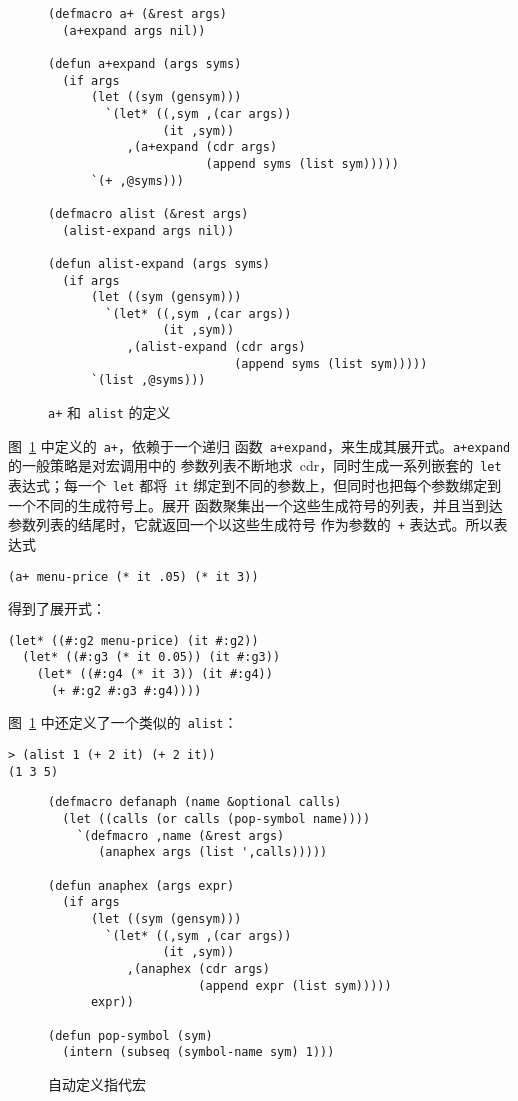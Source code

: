 \begin{figure}
\begin{lstlisting}
(defmacro a+ (&rest args)
  (a+expand args nil))

(defun a+expand (args syms)
  (if args
      (let ((sym (gensym)))
        `(let* ((,sym ,(car args))
                (it ,sym))
           ,(a+expand (cdr args)
                      (append syms (list sym)))))
      `(+ ,@syms)))

(defmacro alist (&rest args)
  (alist-expand args nil))

(defun alist-expand (args syms)
  (if args
      (let ((sym (gensym)))
        `(let* ((,sym ,(car args))
                (it ,sym))
           ,(alist-expand (cdr args)
                          (append syms (list sym)))))
      `(list ,@syms)))
\end{lstlisting}
  \caption{\texttt{a+} 和~\texttt{alist} 的定义}
  \label{fig:definitions_of_aplus_and_alist}
\end{figure}

图~\ref{fig:definitions_of_aplus_and_alist} 中定义的~\verb|a+|，依赖于一个递归
函数~\verb|a+expand|，来生成其展开式。\verb|a+expand| 的一般策略是对宏调用中的
参数列表不断地求~cdr，同时生成一系列嵌套的~\verb|let| 表达式；每一个~\verb|let|
都将~\verb|it| 绑定到不同的参数上，但同时也把每个参数绑定到一个不同的生成符号上。展开
函数聚集出一个这些生成符号的列表，并且当到达参数列表的结尾时，它就返回一个以这些生成符号
作为参数的~\verb|+| 表达式。所以表达式
\begin{lstlisting}
(a+ menu-price (* it .05) (* it 3))
\end{lstlisting}
得到了展开式：
\begin{lstlisting}
(let* ((#:g2 menu-price) (it #:g2))
  (let* ((#:g3 (* it 0.05)) (it #:g3))
    (let* ((#:g4 (* it 3)) (it #:g4))
      (+ #:g2 #:g3 #:g4))))
\end{lstlisting}

图~\ref{fig:definitions_of_aplus_and_alist} 中还定义了一个类似的~\texttt{alist}：
\begin{lstlisting}
> (alist 1 (+ 2 it) (+ 2 it))
(1 3 5)
\end{lstlisting}

\begin{figure}
\begin{lstlisting}
(defmacro defanaph (name &optional calls)
  (let ((calls (or calls (pop-symbol name))))
    `(defmacro ,name (&rest args)
       (anaphex args (list ',calls)))))

(defun anaphex (args expr)
  (if args
      (let ((sym (gensym)))
        `(let* ((,sym ,(car args))
                (it ,sym))
           ,(anaphex (cdr args)
                     (append expr (list sym)))))
      expr))

(defun pop-symbol (sym)
  (intern (subseq (symbol-name sym) 1)))
\end{lstlisting}
  \caption{自动定义指代宏}
  \label{fig:automatic_definition_of_anaphoric_macros}
\end{figure}


